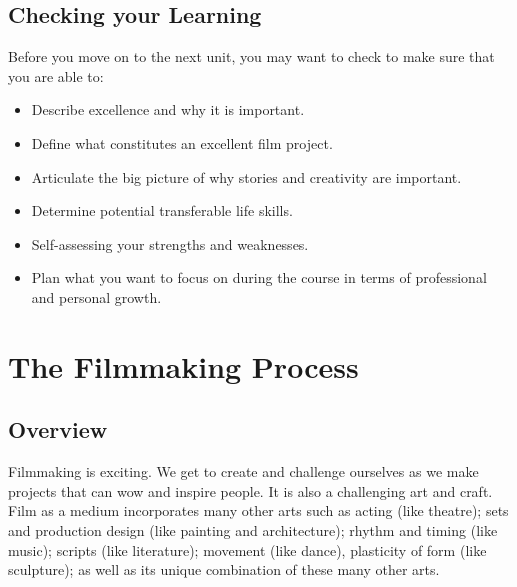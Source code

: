 \documentclass[
]{book}
\providecommand{\tightlist}{%
  \setlength{\itemsep}{0pt}\setlength{\parskip}{0pt}}
\begin{document}
\hypertarget{checking-your-learning}{%
\section*{Checking your Learning}\label{checking-your-learning}}

\begin{progress}
Before you move on to the next unit, you may want to check to make sure that you are able to:

\begin{itemize}
\tightlist
\item
  Describe excellence and why it is important.\\
\item
  Define what constitutes an excellent film project.\\
\item
  Articulate the big picture of why stories and creativity are important.\\
\item
  Determine potential transferable life skills.\\
\item
  Self-assessing your strengths and weaknesses.\\
\item
  Plan what you want to focus on during the course in terms of professional and personal growth.
\end{itemize}
\end{progress}

\hypertarget{the-filmmaking-process}{%
\chapter{The Filmmaking Process}\label{the-filmmaking-process}}

\hypertarget{overview-1}{%
\section*{Overview}\label{overview-1}}

Filmmaking is exciting. We get to create and challenge ourselves as we make projects that can wow and inspire people. It is also a challenging art and craft. Film as a medium incorporates many other arts such as acting (like theatre); sets and production design (like painting and architecture); rhythm and timing (like music); scripts (like literature); movement (like dance), plasticity of form (like sculpture); as well as its unique combination of these many other arts.
\end{document}

